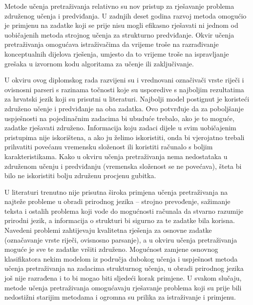 Metode učenja pretraživanja relativno su nov pristup za rješavanje problema
združenog učenja i predviđanja. U zadnjih deset godina razvoj metoda omogućio je
primjenu na zadatke koji se prije nisu mogli efikasno rješavati ni jednom od
uobičajenih metoda strojnog učenja za strukturno predviđanje. Okvir učenja
pretraživanja omogućava istraživačima da vrijeme troše na razrađivanje
konceptualnih dijelova rješenja, umjesto da to vrijeme troše na ispravljanje
grešaka u izvornom kodu algoritama za učenje ili zaključivanje.

U okviru ovog diplomskog rada razvijeni su i vrednovani označivači vrste riječi
i ovisnosni parseri s razinama točnosti koje su usporedive s najboljim
rezultatima za hrvatski jezik koji su prisutni u literaturi. Najbolji model
postignut je koristeći združeno učenje i predviđanje na oba zadatka. Ovo
potvrđuje da za poboljšanje uspješnosti na pojedinačnim zadacima bi ubuduće
trebalo, ako je to moguće, zadatke rješavati združeno. Informacija koju zadaci
dijele u svim uobičajenim pristupima nije iskorištena, a ako ju želimo
iskoristiti, onda bi vjerojatno trebali prihvatiti povećanu vremensku složenost
ili koristiti računalo s boljim karakteristikama. Kako u okviru učenja
pretraživanja nema nedostataka u združenom učenju i predviđanju (vremenska
složenost se ne povećava), šteta bi bilo ne iskoristiti bolju združenu procjenu
gubitka.

U literaturi trenutno nije prisutna široka primjena učenja pretraživanja na
najteže probleme u obradi prirodnog jezika -- strojno prevođenje, sažimanje
teksta i ostalih problema koji vode do mogućnosti računala da stvarno razumije
prirodni jezik, a informacija o strukturi bi sigurno za te zadatke bila korisna.
Navedeni problemi zahtijevaju kvalitetna rješenja za osnovne zadatke
(označavanje vrste riječi, ovisnosno parsanje), a u okviru učenja
pretraživanja moguće je sve te zadatke vršiti združeno. Mogućnost zamjene
osnovnog klasifikatora nekim modelom iz područja dubokog učenja  i uspješnost metoda učenja pretraživanja na zadacima strukturnog
učenja, u obradi prirodnog jezika još nije razrađena i to bi mogao biti sljedeći
korak primjene. U svakom slučaju, metode učenja pretraživanja omogućavaju
rješavanje problema koji su prije bili nedostižni starijim metodama i ogromna su
prilika za istraživanje i primjenu.
